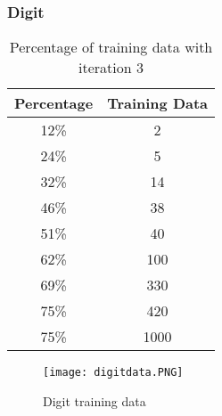 \documentclass{article}
\begin{document}
        \subsubsection{Digit}
            \begin{table}[h]
                \centering
                \begin{tabular}{c|c}
                    \hline
                        Percentage & Training Data \\
                    \hline
                        12\% & 2\\
                    \hline
                        24\% & 5\\
                    \hline
                        32\% & 14\\
                    \hline
                        46\% & 38\\
                    \hline
                        51\% & 40\\
                    \hline
                        62\% & 100\\
                    \hline
                        69\% & 330\\
                    \hline
                        75\% & 420\\
                    \hline
                        75\% & 1000\\
                    \hline
                \end{tabular}
                \caption{Percentage of training data with iteration 3}
            \end{table}
            \newpage
            \begin{figure}[h]
                \centering
                    \texttt{[image: digitdata.PNG]}
                \caption{Digit training data}
            \end{figure}
        
\end{document}
